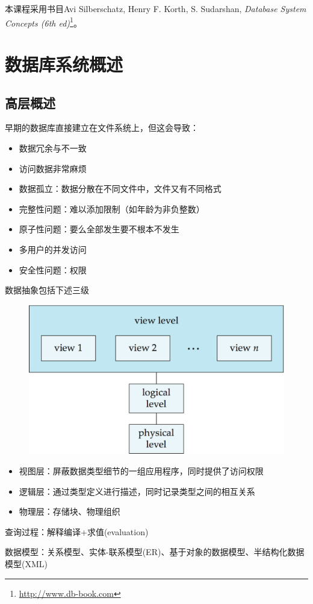 
本课程采用书目Avi Silberschatz, Henry F. Korth, S. Sudarshan, \emph{Database System Concepts (6th ed)}\footnote{\url{http://www.db-book.com}}。

\section{数据库系统概述} %
\subsection{高层概述}
早期的数据库直接建立在文件系统上，但这会导致：
\begin{itemize}
	\item 数据冗余与不一致
	\item 访问数据非常麻烦
	\item 数据孤立：数据分散在不同文件中，文件又有不同格式
	\item 完整性问题：难以添加限制（如年龄为非负整数）
	\item 原子性问题：要么全部发生要不根本不发生
	\item 多用户的并发访问
	\item 安全性问题：权限
\end{itemize}

数据抽象包括下述三级
\begin{figure}[H]
\centering
\includegraphics[width=0.5\linewidth]{fig/view_of_data.png}
\end{figure}
\begin{itemize}
	\item 视图层：屏蔽数据类型细节的一组应用程序，同时提供了访问权限
	\item 逻辑层：通过类型定义进行描述，同时记录类型之间的相互关系
	\item 物理层：存储块、物理组织
\end{itemize}

查询过程：解释编译+求值(evaluation)

数据模型：关系模型、实体-联系模型(ER)、基于对象的数据模型、半结构化数据模型(XML)

